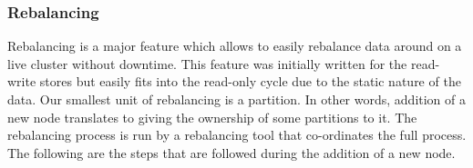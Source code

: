 \subsubsection{Rebalancing}
\label{sec:read_only:data_cycle:rebalancing}

Rebalancing is a major feature which allows \projectname{} to easily
rebalance data around on a live cluster without downtime. This
feature was initially written for the read-write stores but easily
fits into the read-only cycle due to the static nature of the data.
Our smallest unit of rebalancing is a partition. In other words,
addition of a new node translates to giving the ownership of some
partitions to it. The rebalancing process is run by a rebalancing tool
that co-ordinates the full process. The following are the steps that
are followed during the addition of a new node. 

